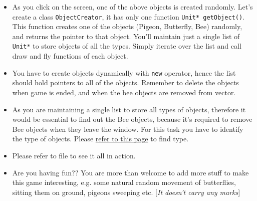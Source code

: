 \documentclass[a4paper,12pt]{article}
\begin{document}
\begin{itemize}
	 	\item As you click on the screen, one of the above objects is created randomly. Let's create a class \texttt{ObjectCreator}, it has only one function \texttt{Unit* getObject()}. This function creates one of the objects (Pigeon, Butterfly, Bee) randomly, and returns the pointer to that object. You'll maintain just a single list of \texttt{Unit*} to store objects of all the types. Simply iterate over the list and call draw and fly functions of each object. 
	 	
	 	\item You have to create objects dynamically with \texttt{new} operator, hence the list should hold pointers to all of the objects. Remember to delete the objects when game is ended, and when the bee objects are removed from vector.
	 	
	 	\item As you are maintaining a single list to store all types of objects, therefore it would be essential to find out the Bee objects, because it's required to remove Bee objects when they leave the window. For this task you have to identify the type of objects. Please \href{https://en.cppreference.com/w/cpp/language/typeid}{refer to this page} to find type.
	 	
	 	
	 	\item Please refer to  file to see it all in action.
	 	
	 	
	 	\item Are you having fun?? You are more than welcome to add more stuff to make this game interesting, e.g. some natural random movement of butterflies, sitting them on ground, pigeons sweeping etc. [\textit{It doesn't carry any marks}]
	 \end{itemize}
 


	
	
\end{document}
